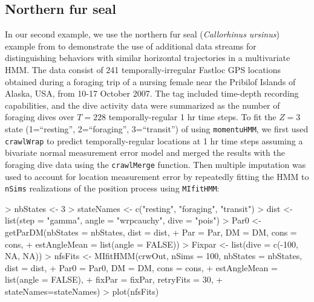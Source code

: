 \documentclass[12pt]{article}
\begin{document}
\subsection{Northern fur seal}
\label{sec:nfs}
In our second example, we use the northern fur seal ({\it Callorhinus ursinus}) example from \cite{McClintockEtAl2014b} to demonstrate the use of additional data streams for distinguishing behaviors with similar horizontal trajectories in a multivariate HMM. The data consist of 241 temporally-irregular Fastloc GPS locations obtained during a foraging trip of a nursing female near the Pribilof Islands of Alaska, USA, from 10-17 October 2007. The tag included time-depth recording capabilities, and the dive activity data were summarized as the number of foraging dives over $T=228$ temporally-regular 1 hr time steps. To fit the $Z=3$ state (1=``resting'', 2=``foraging'', 3=``transit'') of \cite{McClintockEtAl2014b} using \verb|momentuHMM|, we first used \verb|crawlWrap| to predict temporally-regular locations at 1 hr time steps assuming a bivariate normal measurement error model and merged the results with the foraging dive data using the \verb|crawlMerge| function. Then multiple imputation was used to account for location measurement error by repeatedly fitting the HMM to \verb|nSims| realizations of the position process using \verb|MIfitHMM|:%
\begin{Schunk}
\begin{Sinput}
> nbStates <- 3
> stateNames <- c("resting", "foraging", "transit")
> dist <- list(step = "gamma", angle = "wrpcauchy", dive = "pois")
> Par0 <- getParDM(nbStates = nbStates, dist = dist,
+                  Par = Par, DM = DM, cons = cons,
+                  estAngleMean = list(angle = FALSE))
> Fixpar <- list(dive = c(-100, NA, NA))
> nfsFits <- MIfitHMM(crwOut, nSims = 100, nbStates = nbStates, dist = dist,
+                     Par0 = Par0, DM = DM, cons = cons,
+                     estAngleMean = list(angle = FALSE), 
+                     fixPar = fixPar, retryFits = 30,
+                     stateNames=stateNames)
> plot(nfsFits)
\end{Sinput}
\end{Schunk}
\end{document}
